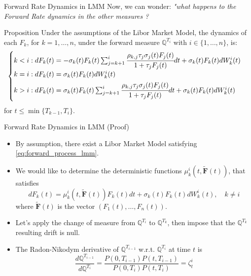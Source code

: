 \documentclass{beamer}
\begin{document}
\begin{frame}{Forward Rate Dynamics in LMM}
	Now, we can wonder: \emph{"what happens to the Forward Rate dynamics in the other measures ?}
	\begin{block}{Proposition}
		Under the assumptions of the Libor Market Model, the dynamics of each $F_k$, for $k = 1,\ldots, n$, under the forward measure $\mathbb{Q}^{T_i}$ with $i \in \{1,\ldots, n\}$, is:
		\begin{equation}
			\begin{cases}
				k < i: dF_k(t) = -\sigma_k(t)F_k(t)\sum_{j=k+1}^i\cfrac{\rho_{k,j}\tau_j\sigma_j(t)F_j(t)}{1+\tau_jF_j(t)}dt + \sigma_k(t)F_k(t)dW^i_k(t) \\ \vspace{0.1cm}
				k = i : dF_k(t) = \sigma_k(t)F_k(t)dW_k^i(t) \\
				\vspace{0.1cm}
				k > i : dF_k(t) = \sigma_k(t)F_k(t)\sum_{j=k+1}^i\cfrac{\rho_{k,j}\tau_j\sigma_j(t)F_j(t)}{1+\tau_jF_j(t)}dt + \sigma_k(t)F_k(t)dW^i_k(t)
			\end{cases}
			\label{eq:forward_rat_dynamics_lfm}
		\end{equation}
		for $t \le \min\{T_{k-1}, T_i\}$.
	\end{block}
\end{frame}

\begin{frame}{Forward Rate Dynamics in LMM (Proof)}
	\begin{itemize}
		\item<1-> By assumption, there exist a Libor Market Model satisfying \cref{eq:forward_process_lmm}.
		\item<2-> We would like to determine the deterministic functions $\mu_k^i(t, \bm{\tilde{F}}(t))$, that satisfies
		\begin{equation}
			dF_k(t) = \mu_k^i(t, \bm{\tilde{F}}(t))F_k(t)dt + \sigma_k(t)F_k(t)dW^i_k(t),\quad k\neq i
			\label{eq:forward_dynamics_in_lfm}
		\end{equation}
		where $\bm{\tilde{F}}(t)$ is the vector $(F_1(t),\ldots, F_n(t))$.
		\item<3-> Let's apply the change of measure from $\mathbb{Q}^{T_i}$ to $\mathbb{Q}^{T_k}$, then impose that the $\mathbb{Q}^{T_k}$ resulting drift is null.
		\item<4-> The Radon-Nikodym derivative of $\mathbb{Q}^{T_{i-1}}$ w.r.t. $\mathbb{Q}^{T_i}$ at time $t$ is
		\begin{equation*}
			\frac{d\mathbb{Q}^{T_{i-1}}}{d\mathbb{Q}^{T_i}} = \frac{P(0, T_{i-1})P(t, T_{i-1})}{P(0, T_i)P(t, T_i)} = \zeta^i_t
		\end{equation*}
	\end{itemize}
\end{frame}
\end{document}
